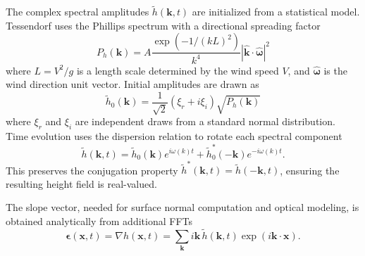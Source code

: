     The complex spectral amplitudes $\tilde{h}(\mathbf{k}, t)$ are initialized from a statistical model. Tessendorf uses the Phillips spectrum \cite{Phillips1958} with a directional spreading factor
    \begin{equation}
        P_h(\mathbf{k}) = A \frac{\exp(-1/(kL)^2)}{k^4} \left|\hat{\mathbf{k}} \cdot \hat{\boldsymbol{\omega}}\right|^2
        \label{eq:phillips_directional}
    \end{equation}
    where $L = V^2/g$ is a length scale determined by the wind speed $V$, and $\hat{\boldsymbol{\omega}}$ is the wind direction unit vector. Initial amplitudes are drawn as
    \begin{equation}
        \tilde{h}_0(\mathbf{k}) = \frac{1}{\sqrt{2}} (\xi_r + i\xi_i) \sqrt{P_h(\mathbf{k})}
        \label{eq:initial_amplitudes}
    \end{equation}
    where $\xi_r$ and $\xi_i$ are independent draws from a standard normal distribution. Time evolution uses the dispersion relation to rotate each spectral component
    \begin{equation}
        \tilde{h}(\mathbf{k}, t) = \tilde{h}_0(\mathbf{k}) e^{i\omega(k)t} + \tilde{h}_0^*(-\mathbf{k}) e^{-i\omega(k)t} .
        \label{eq:time_evolution}
    \end{equation}
    This preserves the conjugation property $\tilde{h}^*(\mathbf{k}, t) = \tilde{h}(-\mathbf{k}, t)$, ensuring the resulting height field is real-valued.

    The slope vector, needed for surface normal computation and optical modeling, is obtained analytically from additional FFTs
    \begin{equation}
        \boldsymbol{\epsilon}(\mathbf{x}, t) = \nabla h(\mathbf{x}, t) = \sum_{\mathbf{k}} i\mathbf{k}\, \tilde{h}(\mathbf{k}, t) \exp(i\mathbf{k} \cdot \mathbf{x}) .
        \label{eq:slope}
    \end{equation}


